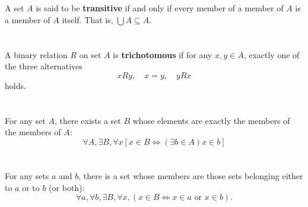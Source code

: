 \documentclass{report}
\begin{document}
\section{}%

A set $A$ is said to be \textbf{transitive} if and only if every member of a
  member of $A$ is a member of $A$ itself.
That is, $\bigcup A \subseteq A$.

\section{}%

A binary relation $R$ on set $A$ is \textbf{trichotomous} if for any
  $x, y \in A$, exactly one of the three alternatives
  $$xRy, \quad x = y, \quad yRx$$
  holds.

\begin{definition}


\end{definition}

\section{}%

For any set $A$, there exists a set $B$ whose elements are exactly the members
  of the members of $A$:
  $$\forall A, \exists B, \forall x
    \left[ x \in B \iff (\exists b \in A) x \in b \right]$$

\begin{axiom}


\end{axiom}

\section{}%

For any sets $a$ and $b$, there is a set whose members are those sets belonging
  either to $a$ or to $b$ (or both):
  $$\forall a, \forall b, \exists B, \forall x,
      (x \in B \iff x \in a \text{ or } x \in b).$$

\begin{axiom}


\end{axiom}
\end{document}
